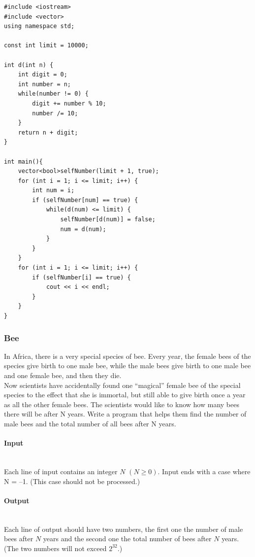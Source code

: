 \documentclass{article}
\begin{document}
\begin{lstlisting}
#include <iostream>
#include <vector>
using namespace std;

const int limit = 10000;

int d(int n) {
	int digit = 0;
	int number = n;
	while(number != 0) {
		digit += number % 10;
		number /= 10;
	}
	return n + digit;
}

int main(){
	vector<bool>selfNumber(limit + 1, true);
	for (int i = 1; i <= limit; i++) {
		int num = i;
		if (selfNumber[num] == true) {
			while(d(num) <= limit) {
				selfNumber[d(num)] = false;
				num = d(num);
			}
		}
	}
	for (int i = 1; i <= limit; i++) {
		if (selfNumber[i] == true) {
			cout << i << endl;
		}
	} 
}
\end{lstlisting}


\subsubsection{Bee}

In Africa, there is a very special species of bee. Every year, the female bees of the species give birth to
one male bee, while the male bees give birth to one male bee and one female bee, and then they die.\\

Now scientists have accidentally found one “magical” female bee of the special species to the
effect that she is immortal, but still able to give birth once a year as all the other female bees. The
scientists would like to know how many bees there will be after N years. Write a program that
helps them find the number of male bees and the total number of all bees after N years.


\paragraph{Input} \mbox{} \\

Each line of input contains an integer $N$ $(N \geq 0)$. Input ends with a case where N = –1. (This case
should not be processed.)

\paragraph{Output}\mbox{} \\

Each line of output should have two numbers, the first one the number of male bees after $N$ years
and the second one the total number of bees after $N$ years. (The two numbers will not exceed $2^{32}$.)
\end{document}
